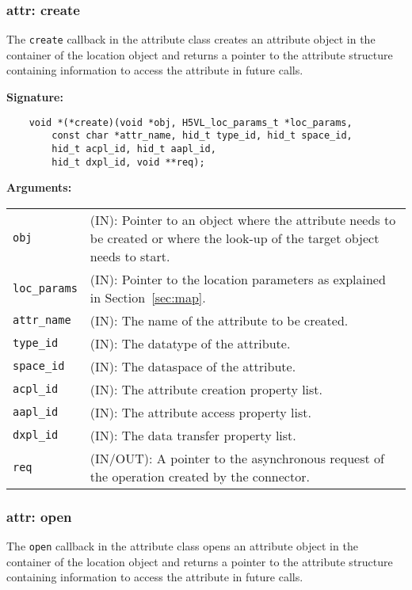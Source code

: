 \subsubsection{attr: create}
The \texttt{create} callback in the attribute class creates an
attribute object in the container of the location object and
returns a pointer to the attribute structure containing information to
access the attribute in future calls. \bigskip

\begin{mdframed}[style=bgbox]
\textbf{Signature:}
\begin{lstlisting}
    void *(*create)(void *obj, H5VL_loc_params_t *loc_params, 
        const char *attr_name, hid_t type_id, hid_t space_id,
        hid_t acpl_id, hid_t aapl_id, 
        hid_t dxpl_id, void **req);
\end{lstlisting}

\textbf{Arguments:}\\
\begin{tabular}{l p{13.5cm}}
  \texttt{obj} & (IN): Pointer to an object where the attribute needs
  to be created or where the look-up of the target object needs to
  start.\\
  \texttt{loc\_params} & (IN): Pointer to the location parameters as explained in
  Section~\ref{sec:map}.\\
  \texttt{attr\_name} & (IN): The name of the attribute to be created.\\
  \texttt{type\_id} & (IN): The datatype of the attribute.\\
  \texttt{space\_id} & (IN): The dataspace of the attribute.\\
  \texttt{acpl\_id} & (IN): The attribute creation property list.\\
  \texttt{aapl\_id} & (IN): The attribute access property list.\\
  \texttt{dxpl\_id} & (IN): The data transfer property list.\\
  \texttt{req} & (IN/OUT): A pointer to the asynchronous request of the
  operation created by the connector.\\
\end{tabular}
\end{mdframed}

\subsubsection{attr: open}
The \texttt{open} callback in the attribute class opens an
attribute object in the container of the location object and returns a
pointer to the attribute structure containing information to access
the attribute in future calls. \bigskip

